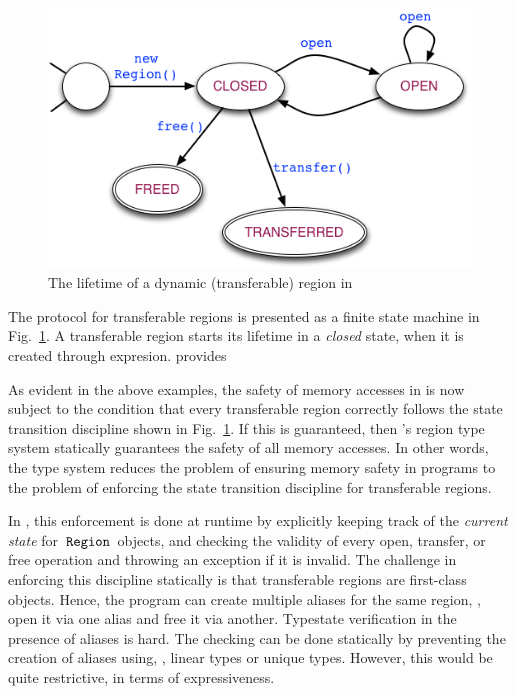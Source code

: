 \begin{figure}
\includegraphics[scale=0.45]{region-fsm.png}
\caption{The lifetime of a dynamic (transferable) region in \name}
\label{fig:region-fsm}
\end{figure}

The protocol for transferable regions is presented as a finite state machine in Fig.~\ref{fig:region-fsm}.
A transferable region starts its lifetime in a \emph{closed} state,
when it is created through  expresion. \name provides

As evident in the above examples, the safety of memory accesses in
\name is now subject to the condition that every transferable region
correctly follows the state transition discipline shown
in Fig.~\ref{fig:region-fsm}. If this is
guaranteed, then \name's region type system statically guarantees the
safety of all memory accesses. In other words, the type system reduces
the problem of ensuring memory safety in \name programs to the problem
of enforcing the state transition discipline for transferable regions.

In \name, this enforcement is done at runtime by explicitly keeping
track of the \emph{current state} for $\,{\tt Region}\,$ objects, and
checking the validity of every open, transfer, or free operation
and throwing an exception if it is invalid.
The challenge in enforcing this discipline statically is that transferable regions
are first-class objects. Hence, the program can create multiple aliases for
the same region, \eg, open it via one alias and free it via another.
Typestate verification in the presence of aliases is hard.
The checking can be done statically by preventing the creation of aliases using, \eg, linear types
or unique types. However, this would be quite restrictive, in terms of expressiveness.

